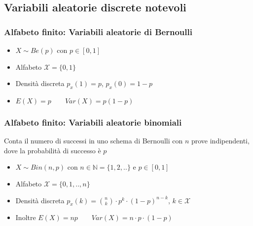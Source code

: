 \documentclass[10pt,a4paper]{article}
\begin{document}
\begin{multicols}{2}
\subsection*{Variabili aleatorie discrete notevoli}
\subsubsection*{Alfabeto finito: Variabili aleatorie di Bernoulli}
\begin{itemize}
    \item $X\sim Be(p)$ con $p \in [0, 1]$ 
    \item Alfabeto $\mathcal{X} = \{0,1\}$
    \item Densità discreta $p_x(1) = p$, $p_x(0) = 1-p$
    \item $E(X) = p \qquad Var(X) = p(1-p)$
\end{itemize}
\subsubsection*{Alfabeto finito: Variabili aleatorie binomiali}
Conta il numero di successi in uno schema di Bernoulli con $n$ prove indipendenti, dove la probabilità di successo è $p$
\begin{itemize}
    \item $X\sim Bin(n,p)$ con $n \in \mathbb{N} = \{1,2,..\}$ e $p \in [0, 1]$ 
    \item Alfabeto $\mathcal{X} = \{0,1,..,n\}$
    \item Densità discreta $p_x(k) ={n \choose k} \cdot p^k \cdot (1-p)^{n-k}$, $k \in \mathcal{X}$
    \item Inoltre $E(X) = np \qquad Var(X) = n\cdot p\cdot(1-p)$
\end{itemize}

\end{multicols}
\end{document}
